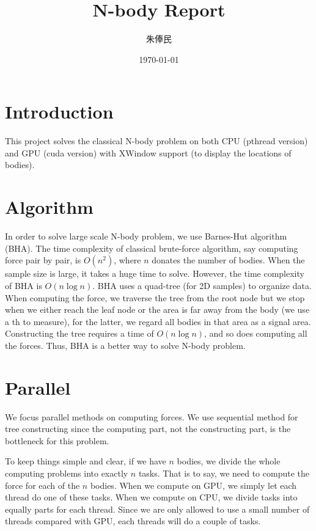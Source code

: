 \documentclass[11pt, a4paper]{article}
\title{\hei N-body Report}
\author{\kai 朱俸民 \quad 2012011894}
\date{\kai \today}
\begin{document}
\maketitle

\section{Introduction}

This project solves the classical N-body problem on both CPU (pthread version) and GPU (cuda version) with XWindow support (to display the locations of bodies).

\section{Algorithm}

In order to solve large scale N-body problem, we use Barnes-Hut algorithm (BHA). The time complexity of classical brute-force algorithm, say computing force pair by pair, is $O(n^2)$, where $n$ donates the number of bodies. When the sample size is large, it takes a huge time to solve. However, the time complexity of BHA is $O(n \log n)$. BHA uses a quad-tree (for 2D samples) to organize data. When computing the force, we traverse the tree from the root node but we stop when we either reach the leaf node or the area is far away from the body (we use a th to measure), for the latter, we regard all bodies in that area as a signal area. Constructing the tree requires a time of $O(n \log n)$, and so does computing all the forces. Thus, BHA is a better way to solve N-body problem.

\section{Parallel}

We focus parallel methods on computing forces. We use sequential method for tree constructing since the computing part, not the constructing part, is the bottleneck for this problem.

To keep things simple and clear, if we have $n$ bodies, we divide the whole computing problems into exactly $n$ tasks. That is to say, we need to compute the force for each of the $n$ bodies. When we compute on GPU, we simply let each thread do one of these tasks. When we compute on CPU, we divide tasks into equally parts for each thread. Since we are only allowed to use a small number of threads compared with GPU, each threads will do a couple of tasks.
\end{document}
